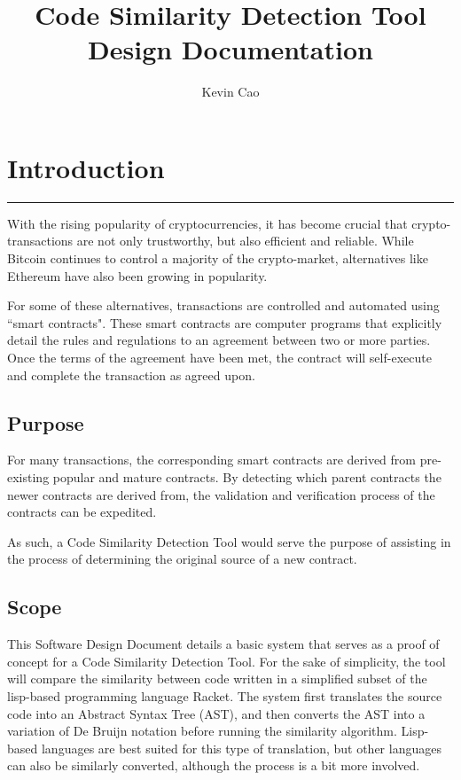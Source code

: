 \documentclass[12pt]{article}
\title{Code Similarity Detection Tool\\
Design Documentation}
\author{Kevin Cao}
\newcommand{\usection}[1]{\section{#1}\hrule\hfill}
\begin{document}
\maketitle

\tableofcontents

\newpage

\usection{Introduction}

With the rising popularity of cryptocurrencies, it has become crucial that crypto-transactions are not only trustworthy, but also efficient and reliable. While Bitcoin continues to control a majority of the crypto-market, alternatives like Ethereum have also been growing in popularity.

\hfill

For some of these alternatives, transactions are controlled and automated using ``smart contracts". These smart contracts are computer programs that explicitly detail the rules and regulations to an agreement between two or more parties. Once the terms of the agreement have been met, the contract will self-execute and complete the transaction as agreed upon.

\subsection{Purpose}
For many transactions, the corresponding smart contracts are derived from pre-existing popular and mature contracts. By detecting which parent contracts the newer contracts are derived from, the validation and verification process of the contracts can be expedited.

\hfill

As such, a Code Similarity Detection Tool would serve the purpose of assisting in the process of determining the original source of a new contract.

\subsection{Scope}

This Software Design Document details a basic system that serves as a proof of concept for a Code Similarity Detection Tool. For the sake of simplicity, the tool will compare the similarity between code written in a simplified subset of the lisp-based programming language Racket. The system first translates the source code into an Abstract Syntax Tree (AST), and then converts the AST into a variation of De Bruijn notation before running the similarity algorithm. Lisp-based languages are best suited for this type of translation, but other languages can also be similarly converted, although the process is a bit more involved.
\end{document}

